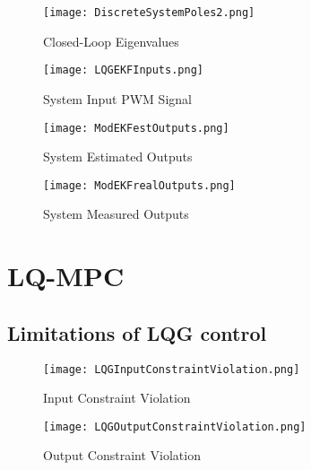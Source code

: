 \documentclass[12pt,a4paper,twoside]{report}
\begin{document}
				\begin{figure}[h!]
					\centering
					\begin{minipage}{0.9\textwidth}
						\centering
						\texttt{[image: DiscreteSystemPoles2.png]}
						\caption{Closed-Loop Eigenvalues}
						\label{fig:closedloopeigenvalues}
					\end{minipage}\hfill
					\begin{minipage}{0.9\textwidth}
						\centering
						\texttt{[image: LQGEKFInputs.png]}	
						\caption{System Input PWM Signal}
						\label{fig:systeminputs}
					\end{minipage}\hfill
				\end{figure}
				
				\begin{figure}[h!]
					\centering
					\begin{minipage}{0.9\textwidth}
						\centering
						\texttt{[image: ModEKFestOutputs.png]}
						\caption{System Estimated Outputs}
						\label{fig:systemestimatedouputs}
					\end{minipage}\hfill
					\begin{minipage}{0.9\textwidth}
						\centering
						\texttt{[image: ModEKFrealOutputs.png]}
						\caption{System Measured Outputs}
						\label{fig:systemmeasuredouputs}
					\end{minipage}
				\end{figure}
			
		\newpage
		
		\section{LQ-MPC}
			
			\subsection{Limitations of LQG control}
				
				\begin{figure}[h!]
					\centering
					\begin{minipage}{0.5\textwidth}
						\centering
						\texttt{[image: LQGInputConstraintViolation.png]}
						\caption{Input Constraint Violation}
						\label{fig:inputconstraintviolation}
					\end{minipage}\hfill
					\begin{minipage}{0.5\textwidth}
						\centering
						\texttt{[image: LQGOutputConstraintViolation.png]}
						\caption{Output Constraint Violation}
						\label{fig:outputconstraintviolation}
					\end{minipage}
				\end{figure}
				
\end{document}

